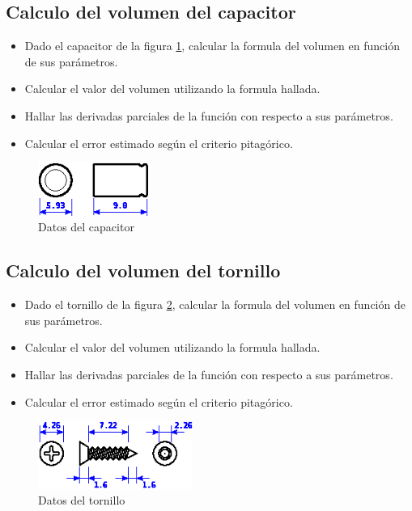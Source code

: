 \documentclass[letter,11pt]{article}
\begin{document}
\subsection{Calculo del volumen del capacitor}
\begin{itemize}
\item Dado el capacitor de la figura \ref{capacitor}, calcular la formula del
volumen en función de sus parámetros.
\item Calcular el valor del volumen utilizando la formula hallada.
\item Hallar las derivadas parciales de la función con respecto a sus
parámetros.
\item Calcular el error estimado según el criterio pitagórico.
\end{itemize}

\begin{figure}
\centering
\includegraphics[width=0.32\textwidth]{eps/02_05.capacitor.eps}
\caption{Datos del capacitor}
\label{capacitor}
\end{figure}

\subsection{Calculo del volumen del tornillo}
\begin{itemize}
\item Dado el tornillo de la figura \ref{tornillo}, calcular la formula del
volumen en función de sus parámetros.
\item Calcular el valor del volumen utilizando la formula hallada.
\item Hallar las derivadas parciales de la función con respecto a sus
parámetros.
\item Calcular el error estimado según el criterio pitagórico.
\end{itemize}

\begin{figure}
\centering
\includegraphics[width=0.45\textwidth]{eps/02_06.tornillo.eps}
\caption{Datos del tornillo}
\label{tornillo}
\end{figure}
\end{document}
